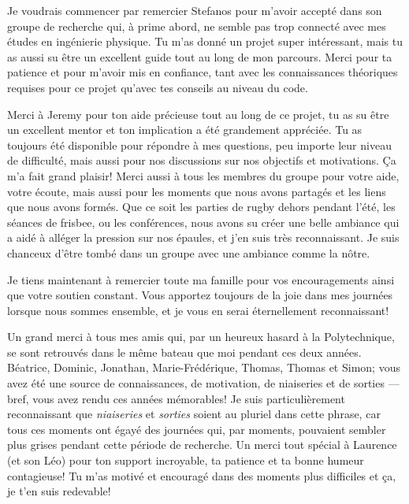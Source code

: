 \begin{comment}
\end{comment}


Je voudrais commencer par remercier Stefanos pour m'avoir accepté dans son groupe de recherche qui, à prime abord, ne semble pas trop connecté avec mes études en ingénierie physique.
Tu m'as donné un projet super intéressant, mais tu as aussi su être un excellent guide tout au long de mon parcours.
Merci pour ta patience et pour m'avoir mis en confiance, tant avec les connaissances théoriques requises pour ce projet qu'avec tes conseils au niveau du code.

Merci à Jeremy pour ton aide précieuse tout au long de ce projet, tu as su être un excellent mentor et ton implication a été grandement appréciée.
Tu as toujours été disponible pour répondre à mes questions, peu importe leur niveau de difficulté, mais aussi pour nos discussions sur nos objectifs et motivations.
Ça m'a fait grand plaisir!
Merci aussi à tous les membres du groupe pour votre aide, votre écoute, mais aussi pour les moments que nous avons partagés et les liens que nous avons formés.
Que ce soit les parties de rugby dehors pendant l'été, les séances de frisbee, ou les conférences, nous avons su créer une belle ambiance qui a aidé à alléger la pression sur nos épaules, et j'en suis très reconnaissant.
Je suis chanceux d'être tombé dans un groupe avec une ambiance comme la nôtre.

Je tiens maintenant à remercier toute ma famille pour vos encouragements ainsi que votre soutien constant.
Vous apportez toujours de la joie dans mes journées lorsque nous sommes ensemble, et je vous en serai éternellement reconnaissant!

Un grand merci à tous mes amis qui, par un heureux hasard à la Polytechnique, se sont retrouvés dans le même bateau que moi pendant ces deux années.
Béatrice, Dominic, Jonathan, Marie-Frédérique, Thomas, Thomas et Simon; vous avez été une source de connaissances, de motivation, de niaiseries et de sorties — bref, vous avez rendu ces années mémorables!
Je suis particulièrement reconnaissant que \textit{niaiseries} et \textit{sorties} soient au pluriel dans cette phrase, car tous ces moments ont égayé des journées qui, par moments, pouvaient sembler plus grises pendant cette période de recherche.
Un merci tout spécial à Laurence (et son Léo) pour ton support incroyable, ta patience et ta bonne humeur contagieuse!
Tu m'as motivé et encouragé dans des moments plus difficiles et ça, je t'en suis redevable!

